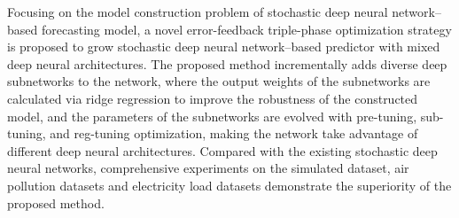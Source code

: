 {    Focusing on the model construction problem of stochastic deep neural network--based forecasting model, a novel error-feedback triple-phase optimization strategy is proposed to grow stochastic deep neural network--based predictor with mixed deep neural architectures. The proposed method incrementally adds diverse deep subnetworks to the network, where the output weights of the subnetworks are calculated via ridge regression to improve the robustness of the constructed model, and the parameters of the subnetworks are evolved with pre-tuning, sub-tuning, and reg-tuning optimization, making the network take advantage of different deep neural architectures. Compared with the existing stochastic deep neural networks, comprehensive experiments on the simulated dataset, air pollution datasets and electricity load datasets demonstrate the superiority of the proposed method.
}

